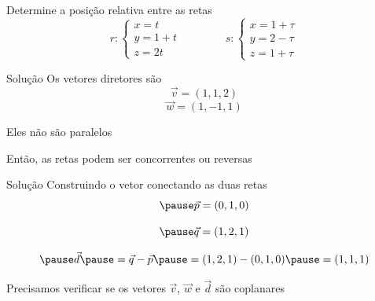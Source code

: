 \begin{question}
  Determine a posição relativa entre as retas
  \[
    r\colon
    \begin{cases}
      x = t   \\
      y = 1+t \\
      z = 2t
    \end{cases}
  \qquad\qquad
    s\colon
    \begin{cases}
      x = 1+\tau \\
      y = 2-\tau \\
      z = 1+\tau
    \end{cases}
  \]
\end{question}

\begin{resolution}{Solução}
  Os vetores diretores são
  \[
    \vec{v} = (1, 1, 2)
  \]
  \[
    \vec{w} = (1, -1, 1)
  \]

  \pause
  Eles não são paralelos

  \pause
  Então, as retas podem ser concorrentes ou reversas
\end{resolution}

\begin{resolution}{Solução}
  Construindo o vetor conectando as duas retas
  \[
    \pause
    \vec{p} = (0, 1, 0)
  \]

  \[
    \pause
    \vec{q} = (1, 2, 1)
  \]

  \[
    \pause
    \vec{d}
    \pause
    = \vec{q} - \vec{p}
    \pause
    = (1, 2, 1) - (0, 1, 0)
    \pause
    = (1, 1, 1)
  \]

  \pause
  Precisamos verificar se os vetores $\vec{v}$, $\vec{w}$ e $\vec{d}$ são coplanares
\end{resolution}

